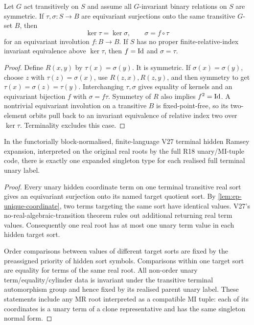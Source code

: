 \begin{lemma}
\label{lem:ep-unique-coordinate}
Let \(G\) act transitively on \(S\) and assume
all \(G\)-invariant binary relations on \(S\)
are symmetric. If \(\tau,\sigma:S\to B\)
are equivariant surjections onto the same
transitive \(G\)-set \(B\), then
\[
 \ker\tau=\ker\sigma,\qquad
 \sigma=f\circ\tau
\]
for an equivariant involution \(f:B\to B\).
If \(S\) has no proper finite-relative-index
invariant equivalence above \(\ker\tau\),
then \(f=\mathrm{Id}\) and \(\sigma=\tau\).
\end{lemma}
\begin{proof}
Define \(R(x,y)\) by
\(\tau(x)=\sigma(y)\). It is symmetric.
If \(\sigma(x)=\sigma(y)\), choose \(z\)
with \(\tau(z)=\sigma(x)\), use
\(R(z,x),R(z,y)\), and then symmetry
to get \(\tau(x)=\sigma(z)=\tau(y)\).
Interchanging \(\tau,\sigma\) gives equality
of kernels and an equivariant bijection
\(f\) with \(\sigma=f\tau\).
Symmetry of \(R\) also implies \(f^2=\mathrm{Id}\).
A nontrivial equivariant involution on a
transitive \(B\) is fixed-point-free, so
its two-element orbits pull back to an
invariant equivalence of relative index
two over \(\ker\tau\). Terminality excludes
this case.
\end{proof}

\begin{corollary}
\label{cor:ep-singleton-faithful}
In the functorially block-normalised,
finite-language V27 terminal hidden Ramsey
expansion, interpreted on the original real
roots by the full R18 unary/MI-tuple code,
there is exactly one expanded singleton
type for each realised full terminal unary
label.
\end{corollary}
\begin{proof}
Every unary hidden coordinate term on
one terminal transitive real sort gives
an equivariant surjection onto its named
target quotient sort. By
\cref{lem:ep-unique-coordinate}, two
terms targeting the same sort have
identical values. V27's
no-real-algebraic-transition theorem
rules out additional returning real
term values. Consequently one real
root has at most one unary term value
in each hidden target sort.

Order comparisons between values of
different target sorts are fixed by the
preassigned priority of hidden sort
symbols. Comparisons within one target
sort are equality for terms of the
same real root. All non-order unary
term/equality/cylinder data is invariant
under the transitive terminal
automorphism group and hence fixed by
its realised parent unary label. These
statements include any MR root interpreted
as a compatible MI tuple: each of its
coordinates is a unary term of a clone
representative and has the same
singleton normal form.
\end{proof}

